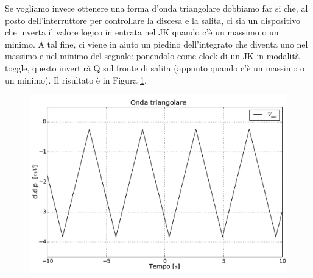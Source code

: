 Se vogliamo invece ottenere una forma d'onda triangolare dobbiamo far si che, al posto dell'interruttore per controllare la discesa e la salita, ci sia un dispositivo che inverta il valore logico in entrata nel JK quando c'è un massimo o un minimo. A tal fine, ci viene in aiuto un piedino dell'integrato che diventa uno nel massimo e nel minimo del segnale: ponendolo come clock di un JK in modalità toggle, questo invertirà Q sul fronte di salita (appunto quando c'è un massimo o un minimo). Il risultato è in Figura \ref{fig12:triangolare}.

\begin{figure}[htpc]
\centering
	\includegraphics[width=.65\textwidth]{../E12/latex/triangolare.pdf}
	\caption{}
	\label{fig12:triangolare}
\end{figure}